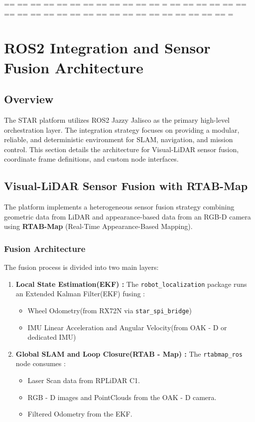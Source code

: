     == == == == == == == == == == == ==
    = %
      == == == == == == == == == == == == == == == == == == == == == == ==
    =

\section{ROS2 Integration and Sensor Fusion Architecture
}

\subsection{Overview}

The STAR platform utilizes ROS2 Jazzy Jalisco as the primary high-level orchestration layer. The integration strategy focuses on providing a modular, reliable, and deterministic environment for SLAM, navigation, and mission control. This section details the architecture for Visual-LiDAR sensor fusion, coordinate frame definitions, and custom node interfaces.

\subsection{Visual-LiDAR Sensor Fusion with RTAB-Map}

The platform implements a heterogeneous sensor fusion strategy combining geometric data from LiDAR and appearance-based data from an RGB-D camera using \textbf{RTAB-Map} (Real-Time Appearance-Based Mapping).

\subsubsection{Fusion Architecture}
The fusion process is divided into two main layers:
\begin{enumerate}
\item \textbf{Local State Estimation(EKF) :
} The \texttt{robot\_localization} package runs an Extended Kalman
                  Filter(EKF) fusing :
    \begin{itemize}
\item Wheel Odometry(from RX72N via \texttt{star\_spi\_bridge})
        \item IMU Linear Acceleration and Angular
    Velocity(from OAK - D or dedicated IMU)
    \end{itemize}
\item \textbf{Global SLAM and Loop Closure(RTAB - Map) :
} The \texttt{rtabmap\_ros} node consumes :
    \begin{itemize}
\item Laser Scan data from RPLiDAR C1.
        \item RGB - D images and PointClouds from the OAK -
    D camera.
        \item Filtered Odometry from the EKF.
    \end{itemize}
\end{enumerate}

